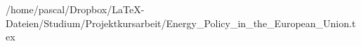 /home/pascal/Dropbox/LaTeX-Dateien/Studium/Projektkursarbeit/Energy_Policy_in_the_European_Union.tex
